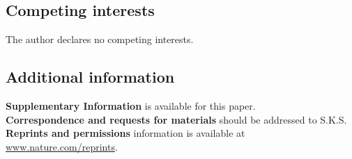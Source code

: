 \documentclass[12pt]{article}
\begin{document}
\subsection*{Competing interests}
The author declares no competing interests.

\subsection*{Additional information}
\noindent\textbf{Supplementary Information} is available for this paper.\\
\noindent\textbf{Correspondence and requests for materials} should be addressed to S.K.S.\\
\noindent\textbf{Reprints and permissions} information is available at \url{www.nature.com/reprints}.
\end{document}
